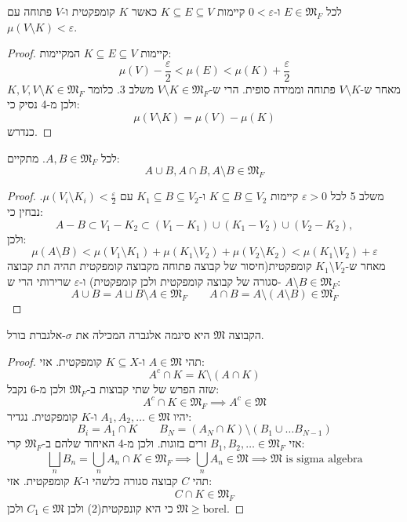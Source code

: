 \documentclass{tstextbook}
\begin{document}
\begin{lemma}[שלב 5]
לכל \(E \in \mathfrak{M}_{F}\) ו-\(0<\varepsilon\) קיימות \(K\subseteq E \subseteq V\) כאשר \(K\) קומפקטית ו-\(V\) פתוחה עם \(\mu\left( V\setminus K \right)< \varepsilon\).

\end{lemma}
\begin{proof}
קיימות \(K\subseteq E \subseteq V\) המקיימות:
$$\mu(V)-\frac{\varepsilon}{2}< \mu(E) < \mu(K)+\frac{\varepsilon}{2}$$
מאחר ש-\(V \setminus K\) פתוחה וממידה סופית. הרי ש-\(V \setminus K \in \mathfrak{M}_{F}\) משלב 3. כלומר \(K,V, V\setminus K \in \mathfrak{M}_{F}\) ולכן מ-4 נסיק כי:
$$\mu\left( V \setminus  K \right)= \mu(V)-\mu(K)$$
כנדרש.

\end{proof}
\begin{lemma}[שלב 6]
לכל \(A,B \in \mathfrak{M}_{F}\). מתקיים:
$$A\cup B, A\cap B , A \setminus  B \in \mathfrak{M} _{F}$$

\end{lemma}
\begin{proof}
משלב 5 לכל \(\varepsilon>0\) קיימות \(K\subseteq B \subseteq V_{2}\) ו-\(K_{1} \subseteq B \subseteq V_{2}\) עם \(\mu\left( V_{i}\setminus K_{i} \right)<\frac{\varepsilon}{2}\). נבחין כי:
$$A-B\subset V_{1}-K_{2}\subset(V_{1}-K_{1})\cup(K_{1}-V_{2})\cup(V_{2}-K_{2}),$$
ולכן:
$$\mu\left( A\setminus  B \right)< \mu\left( V_{1} \setminus  K_{1} \right)+\mu\left( K_{1} \setminus  V_{2} \right)+\mu\left( V_{2}\setminus  K_{2} \right)< \mu\left( K_{1} \setminus  V_{2} \right)+\varepsilon$$
מאחר ש-\(K_{1} \setminus V_{2}\) קומפקטית(חיסור של קבוצה פתוחה מקבוצה קומפקטית תהיה תת קבוצה סגורה של קבוצה קומפקטית ולכן קומפקטית) ו-\(\varepsilon\) שרירותי הרי ש- \(A \setminus B \in \mathfrak{M}_{F}\):
$$A\cup B = A \sqcup B \setminus  A \in \mathfrak{ M} _{F} \qquad  A \cap B = A \setminus  \left( A \setminus  B \right)\in \mathfrak{ M} _{F}$$

\end{proof}
\begin{lemma}[שלב 7]
הקבוצה \(\mathfrak{M}\) היא סיגמה אלגברה המכילה את \(\sigma\)-אלגברת בורל.

\end{lemma}
\begin{proof}
תהי \(A\in \mathfrak{ M}\) ו-\(K \subseteq X\) קומפקטית. אזי:
$$A^{c}\cap K = K \setminus  \left( A \cap K \right)$$
שזה הפרש של שתי קבוצות ב-\(\mathfrak{M}_{F}\) ולכן מ-6 נקבל:
$$A^{c}\cap K \in \mathfrak{M} _{F}\implies A^{c}\in \mathfrak{M} $$
יהיו \(A_{1},A_{2},\dots \in \mathfrak{M}\) ו-\(K\) קומפקטית. נגדיר:
$$B_{i}=A_{1} \cap K\qquad  B_{N}=\left( A_{N}\cap K \right)\setminus \left( B_{1} \cup \dots B_{N-1} \right)$$
אזי \(B_{1},B_{2},\dots \in \mathfrak{M}_{F}\) זרים בזוגות. ולכן מ-4 האיחוד שלהם ב-\(\mathfrak{M}_{F}\) קרי:
$$\bigsqcup_{n}B_{n}= \bigcup_{n} A_{n}\cap K \in \mathfrak{M} _{F}  \implies \bigcup_{n} A_{n}  \in \mathfrak{ M} \implies \mathfrak{ M} \text{ is sigma algebra}$$
תהי \(C\) קבוצה סגורה כלשהי ו-\(K\) קומפקטית. אזי:
$$C\cap K \in \mathfrak{M} _{F}$$
כי היא קונפקטית(2) ולכן \(C_{1} \in \mathfrak{M}\) ולכן \(\mathfrak{M}\geq \text{borel}\).

\end{proof}
\end{document}
